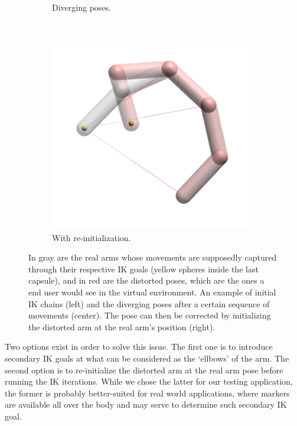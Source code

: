 \begin{figure}[h]
\begin{subfigure}[b]{0.3\textwidth}
        \caption{Diverging poses.}
        \label{subfig:divergence}
    \end{subfigure}
    ~
    \begin{subfigure}[b]{0.28\textwidth}
        \includegraphics[width=\textwidth]{Figures/arm_initDivergence.png}
        \caption{With re-initialization.}
        \label{subfig:initDivergence}
    \end{subfigure}
    \caption{In gray are the real arms whose movements are supposedly captured through their respective IK goals (yellow spheres inside the last capsule), and in red are the distorted poses, which are the ones a end user would see in the virtual environment. An example of initial IK chains (left) and the diverging poses after a certain sequence of movements (center). The pose can then be corrected by initializing the distorted arm at the real arm's position (right).}
    \label{fig:divergence}
\end{figure}

Two options exist in order to solve this issue. The first one is to introduce secondary IK goals at what can be considered as the `ellbows' of the arm. The second option is to re-initialize the distorted arm at the real arm pose before running the IK iterations. While we chose the latter for our testing application, the former is probably better-suited for real world applications, where markers are available all over the body and may serve to determine such secondary IK goal.
